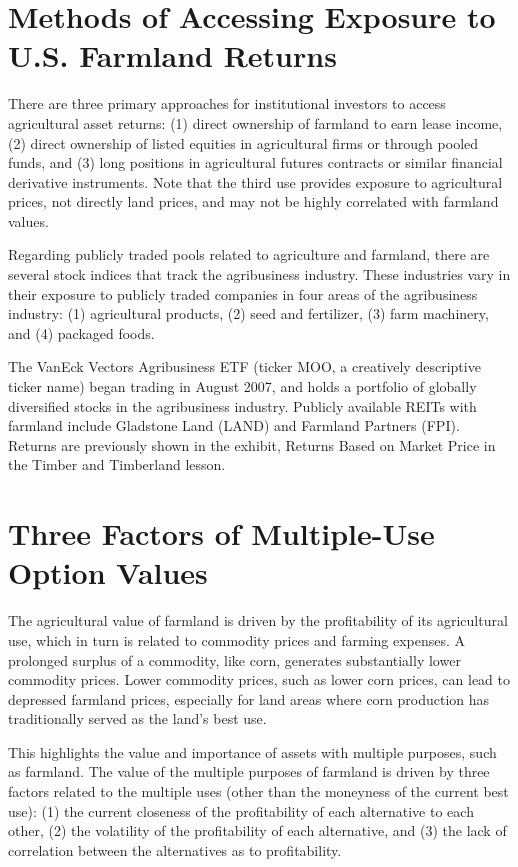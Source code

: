 \documentclass[11pt]{article}
\begin{document}
\section*{Methods of Accessing Exposure to U.S. Farmland Returns}
There are three primary approaches for institutional investors to access agricultural asset returns: (1) direct ownership of farmland to earn lease income, (2) direct ownership of listed equities in agricultural firms or through pooled funds, and (3) long positions in agricultural futures contracts or similar financial derivative instruments. Note that the third use provides exposure to agricultural prices, not directly land prices, and may not be highly correlated with farmland values.

Regarding publicly traded pools related to agriculture and farmland, there are several stock indices that track the agribusiness industry. These industries vary in their exposure to publicly traded companies in four areas of the agribusiness industry: (1) agricultural products, (2) seed and fertilizer, (3) farm machinery, and (4) packaged foods.

The VanEck Vectors Agribusiness ETF (ticker MOO, a creatively descriptive ticker name) began trading in August 2007, and holds a portfolio of globally diversified stocks in the agribusiness industry. Publicly available REITs with farmland include Gladstone Land (LAND) and Farmland Partners (FPI). Returns are previously shown in the exhibit, Returns Based on Market Price in the Timber and Timberland lesson.

\section*{Three Factors of Multiple-Use Option Values}
The agricultural value of farmland is driven by the profitability of its agricultural use, which in turn is related to commodity prices and farming expenses. A prolonged surplus of a commodity, like corn, generates substantially lower commodity prices. Lower commodity prices, such as lower corn prices, can lead to depressed farmland prices, especially for land areas where corn production has traditionally served as the land's best use.

This highlights the value and importance of assets with multiple purposes, such as farmland. The value of the multiple purposes of farmland is driven by three factors related to the multiple uses (other than the moneyness of the current best use): (1) the current closeness of the profitability of each alternative to each other, (2) the volatility of the profitability of each alternative, and (3) the lack of correlation between the alternatives as to profitability.
\end{document}
